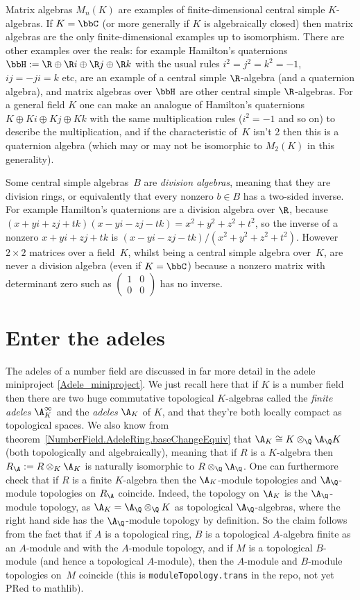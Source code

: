 Matrix algebras $M_n(K)$ are examples of finite-dimensional central simple $K$-algebras.
If $K=\bbC$ (or more generally if $K$ is algebraically closed)
then matrix algebras are the only finite-dimensional examples
up to isomorphism. There are other examples over the reals: for example Hamilton's quaternions
$\bbH:=\R\oplus\R i\oplus\R j\oplus\R k$ with the usual rules $i^2=j^2=k^2=-1$,
$ij=-ji=k$ etc, are an example of a central simple $\R$-algebra (and a quaternion algebra), and
matrix algebras over $\bbH$ are other central simple $\R$-algebras.
For a general field $K$
one can make an analogue of Hamilton's quaternions $K\oplus Ki\oplus Kj\oplus Kk$ with the
same multiplication rules ($i^2=-1$ and so on) to describe the multiplication, and if the characteristic
of~$K$ isn't 2
then this is a quaternion algebra (which may or may not be isomorphic to $M_2(K)$ in this
generality).

Some central simple algebras~$B$ are \emph{division algebras}, meaning that they are division
rings, or equivalently that every nonzero $b\in B$ has a two-sided inverse. For example
Hamilton's quaternions are a division algebra over $\R$,
because $(x+yi+zj+tk)(x-yi-zj-tk)=x^2+y^2+z^2+t^2$, so the inverse
of a nonzero $x+yi+zj+tk$ is $(x-yi-zj-tk)/(x^2+y^2+z^2+t^2)$.
However $2\times 2$ matrices over a field~$K$, whilst being a central simple algebra
over~$K$, are never a division algebra
(even if $K=\bbC$) because a nonzero matrix with determinant zero such as
$\begin{pmatrix}1&0\\0&0\end{pmatrix}$ has no inverse.

\section{Enter the adeles}

The adeles of a number field are discussed in far more detail
in the adele miniproject \ref{Adele_miniproject}. We just recall here that if $K$ is a number field
then there are two huge commutative topological $K$-algebras called the \emph{finite adeles}
$\A_K^\infty$ and the \emph{adeles} $\A_K$ of $K$, and that they're both locally compact
as topological spaces. We also know from theorem~\ref{NumberField.AdeleRing.baseChangeEquiv}
that $\A_K\cong K\otimes_{\Q}\A_{\Q}K$ (both topologically and algebraically), meaning
that if $R$ is a $K$-algebra then $R_{\A} := R\otimes_K\A_K$ is naturally isomorphic
to $R\otimes_{\Q}\A_{\Q}$. One can
furthermore check that if $R$ is a finite $K$-algebra then the $\A_K$-module topologies and $\A_{\Q}$-module
topologies on $R_{\A}$ coincide. Indeed, the topology on $\A_K$
is the $\A_{\Q}$-module topology, as
$\A_K=\A_{\Q}\otimes_{\Q}K$ as topological $\A_{\Q}$-algebras, where the right hand side
has the $\A_{\Q}$-module topology by definition. So the claim follows from the
fact that if $A$ is a topological ring, $B$ is a topological $A$-algebra
finite as an $A$-module and with the $A$-module topology, and if
$M$ is a topological $B$-module
(and hence a topological $A$-module), then the $A$-module and $B$-module
topologies on~$M$ coincide (this is {\tt moduleTopology.trans} in the repo,
not yet PRed to mathlib).

